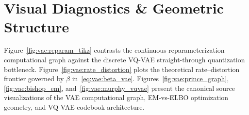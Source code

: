 \documentclass[../../../../master.tex]{subfiles}
\begin{document}
\section{Visual Diagnostics \& Geometric Structure}\label{sec:vae:visuals}

Figure~\ref{fig:vae:reparam_tikz} contrasts the continuous reparameterization computational graph against the discrete VQ-VAE straight-through quantization bottleneck. Figure~\ref{fig:vae:rate_distortion} plots the theoretical rate--distortion frontier governed by $\beta$ in~\eqref{eq:vae:beta_vae}. Figures~\ref{fig:vae:prince_graph}, \ref{fig:vae:bishop_em}, and~\ref{fig:vae:murphy_vqvae} present the canonical source visualizations of the VAE computational graph, EM-vs-ELBO optimization geometry, and VQ-VAE codebook architecture.
\end{document}
